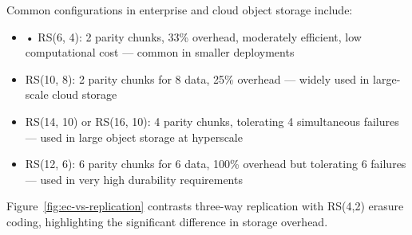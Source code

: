 Common configurations in enterprise and cloud object storage include:

\begin{itemize}
  \item • RS(6, 4): 2 parity chunks, 33\% overhead, moderately efficient, low computational cost --- common in smaller deployments
  \item RS(10, 8): 2 parity chunks for 8 data, 25\% overhead --- widely used in large-scale cloud storage
  \item RS(14, 10) or RS(16, 10): 4 parity chunks, tolerating 4 simultaneous failures --- used in large object storage at hyperscale
  \item RS(12, 6): 6 parity chunks for 6 data, 100\% overhead but tolerating 6 failures --- used in very high durability requirements
\end{itemize}

Figure~\ref{fig:ec-vs-replication} contrasts three-way replication with RS(4,2) erasure coding, highlighting the significant difference in storage overhead.

